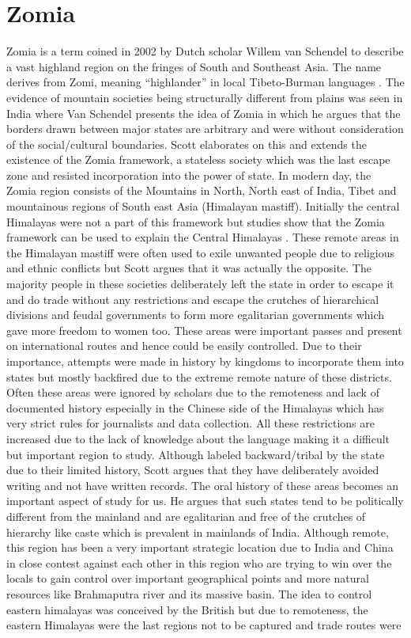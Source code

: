 \section{Zomia}
 Zomia is a term coined in 2002 by Dutch scholar Willem van Schendel to describe a vast highland region on the fringes of South and Southeast Asia. The name derives from Zomi, meaning “highlander” in local Tibeto-Burman languages \citep{van2005geographies}. 
 The evidence of mountain societies being structurally different from plains was seen in India where Van Schendel \citep{van2005geographies} presents the idea of Zomia in which he argues that the borders drawn between major states are arbitrary and were without consideration of the social/cultural boundaries. 
Scott \citep{jamesscott} elaborates on this and extends the existence of the Zomia framework, a stateless society which was the last escape zone and resisted incorporation into the power of state. In modern day, the Zomia region consists of the Mountains in North, North east of India, Tibet and mountainous regions of South east Asia (Himalayan mastiff). Initially the central Himalayas were not a part of this framework but studies  show that the Zomia framework can be used to explain the Central Himalayas \citep{shneiderman2010central}. These remote areas in the Himalayan mastiff were often used to exile unwanted people due to religious and ethnic conflicts but Scott argues that it was actually the opposite. The majority people in these societies deliberately left the state in order to escape it and do trade without any restrictions and escape the crutches of hierarchical divisions and feudal governments to form more egalitarian governments which gave more freedom to women too. These areas were important passes and present on international routes and hence could be easily controlled. Due to their importance, attempts were made in history by kingdoms to incorporate them into states but mostly backfired due to the extreme remote nature of these districts. Often these areas were ignored by scholars due to the remoteness and lack of documented history especially in the Chinese side of the Himalayas which has very strict rules for journalists and data collection. All these restrictions are increased due to the lack of knowledge about the language making it a difficult but important region to study. Although labeled backward/tribal by the state due to their limited history, Scott argues that they have deliberately avoided writing and not have written records. The oral history of these areas becomes an important aspect of study for us. He argues that such states tend to be politically different from the mainland and are egalitarian and free of the crutches of hierarchy like caste which is prevalent in mainlands of India. Although remote, this region has been a very important strategic location due to India and China in close contest against each other in this region who are trying to win over the locals to gain control over important geographical points  and more natural resources like Brahmaputra river and its massive basin. The idea to control eastern himalayas was conceived by the British but due to remoteness, the eastern Himalayas were the last regions not to be captured and trade routes were 